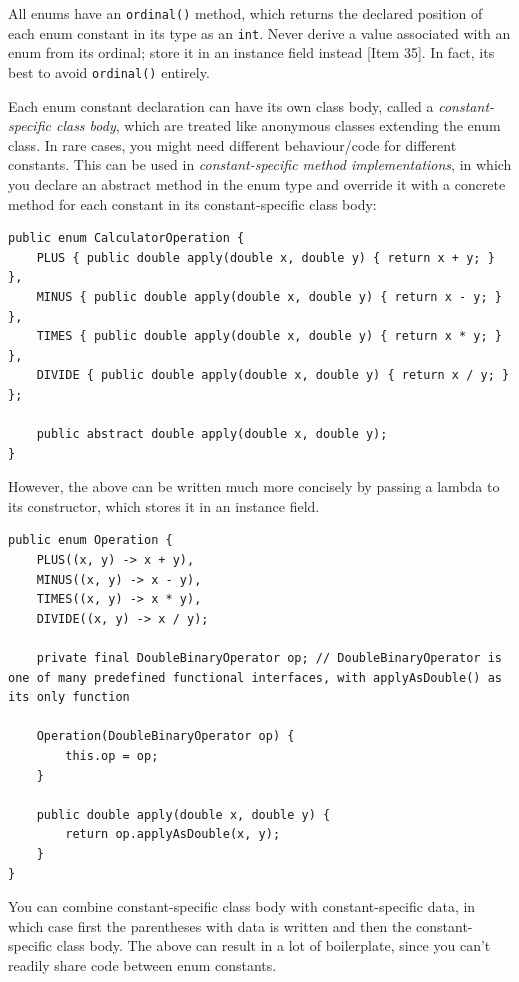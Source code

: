 \documentclass[table, xcdraw]{article}%
\begin{document}
All enums have an \texttt{ordinal()} method, which returns the declared position of each enum constant in its type as an \texttt{int}. Never derive a value associated with an enum from its ordinal; store it in an instance field instead [Item 35]. In fact, its best to avoid \texttt{ordinal()} entirely.

Each enum constant declaration can have its own class body, called a \emph{constant-specific class body}, which are treated like anonymous classes extending the enum class. In rare cases, you might need different behaviour/code for different constants. This can be used in \emph{constant-specific method implementations}, in which you declare an abstract method in the enum type and override it with a concrete method for each constant in its constant-specific class body:

\begin{verbatim}
public enum CalculatorOperation {
    PLUS { public double apply(double x, double y) { return x + y; } },
    MINUS { public double apply(double x, double y) { return x - y; } },
    TIMES { public double apply(double x, double y) { return x * y; } },
    DIVIDE { public double apply(double x, double y) { return x / y; } };
    
    public abstract double apply(double x, double y);
}
\end{verbatim}

However, the above can be written much more concisely by passing a lambda to its constructor, which stores it in an instance field.

\begin{verbatim}
public enum Operation {
    PLUS((x, y) -> x + y),
    MINUS((x, y) -> x - y),
    TIMES((x, y) -> x * y),
    DIVIDE((x, y) -> x / y);
    
    private final DoubleBinaryOperator op; // DoubleBinaryOperator is one of many predefined functional interfaces, with applyAsDouble() as its only function
    
    Operation(DoubleBinaryOperator op) {
        this.op = op;
    }
    
    public double apply(double x, double y) {
        return op.applyAsDouble(x, y);
    }
}
\end{verbatim}

You can combine constant-specific class body with constant-specific data, in which case first the parentheses with data is written and then the constant-specific class body. The above can result in a lot of boilerplate, since you can't readily share code between enum constants.
\end{document}
